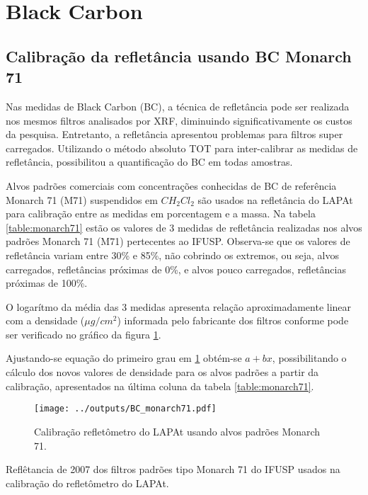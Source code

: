 \section{Black Carbon}

\subsection{Calibração da refletância usando BC Monarch 71}

Nas medidas de Black Carbon (BC), a técnica de refletância pode ser realizada nos mesmos filtros analisados por XRF, diminuindo significativamente os custos da pesquisa. Entretanto, a refletância apresentou problemas para filtros super carregados. Utilizando o método absoluto TOT para inter-calibrar as medidas de refletância, possibilitou a quantificação do BC em todas amostras.

Alvos padrões comerciais com concentrações conhecidas de BC de referência 
Monarch 71 (M71) suspendidos em $CH_2Cl_2$ \citep{clarke1986} são usados na 
refletância do LAPAt para calibração entre as medidas em porcentagem e a massa.
Na tabela \ref{table:monarch71} estão os valores de 3 medidas de refletância  
realizadas nos alvos padrões Monarch 71 (M71) pertecentes ao IFUSP.
Observa-se que os valores de refletância variam entre 30\% e 85\%, não cobrindo
os extremos, ou seja, alvos carregados, refletâncias próximas de 0\%, e alvos
pouco carregados, refletâncias próximas de 100\%.

O logarítmo da média das 3 medidas apresenta relação aproximadamente linear 
com a densidade ($\mu g /cm^2$) informada pelo fabricante dos filtros 
conforme pode ser verificado no gráfico da figura \ref{fig:monarch71}.

Ajustando-se equação do primeiro grau em \ref{fig:monarch71} obtém-se 
$a + bx$, possibilitando o cálculo dos novos valores de densidade para os 
alvos padrões a partir da calibração, apresentados na última coluna da tabela 
\ref{table:monarch71}.

\begin{figure}[H]
  \centering
  \texttt{[image: ../outputs/BC\_monarch71.pdf]}
  \caption{Calibração refletômetro do LAPAt usando alvos padrões Monarch 71.
         \label{fig:monarch71}}
\end{figure}

\newpage
\begin{table}[H]
  \centering
  \small
    
    \caption{Reflêtancia de 2007 dos filtros padrões tipo Monarch 71 
             do IFUSP usados na calibração do refletômetro do 
             LAPAt.  \label{table:monarch71}}
\end{table} 

